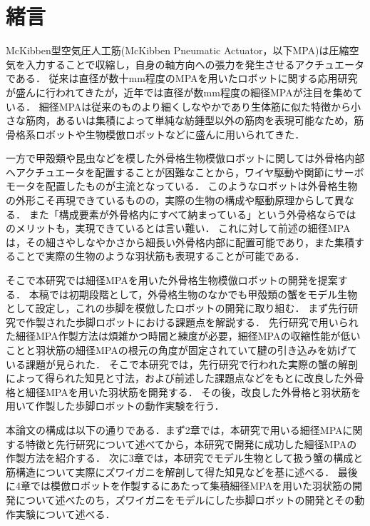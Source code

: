 \newpage
\setcounter{page}{1}
\section{緒言}
McKibben型空気圧人工筋(McKibben Pneumatic Actuator，以下MPA)は圧縮空気を入力することで収縮し，自身の軸方向への張力を発生させるアクチュエータである\cite{2003722}．
従来は直径が数十mm程度のMPAを用いたロボットに関する応用研究が盛んに行われてきたが，近年では直径が数mm程度の細径MPAが注目を集めている\cite{wakimoto}．
細径MPAは従来のものより細くしなやかであり生体筋に似た特徴から小さな筋肉，あるいは集積によって単純な紡錘型以外の筋肉を表現可能なため，筋骨格系ロボットや生物模倣ロボットなどに盛んに用いられてきた\cite{森田隆介2016}\cite{森和也2014}．

一方で甲殻類や昆虫などを模した外骨格生物模倣ロボットに関しては外骨格内部へアクチュエータを配置することが困難なことから，ワイヤ駆動や関節にサーボモータを配置したもの\cite{jmse10121804}が主流となっている．
このようなロボットは外骨格生物の外形こそ再現できているものの，実際の生物の構成や駆動原理からして異なる．
また「構成要素が外骨格内にすべて納まっている」という外骨格ならではのメリットも，実現できているとは言い難い．
これに対して前述の細径MPAは，その細さやしなやかさから細長い外骨格内部に配置可能であり，また集積することで実際の生物のような羽状筋も表現することが可能である\cite{2003}．

そこで本研究では細径MPAを用いた外骨格生物模倣ロボットの開発を提案する．
本稿では初期段階として，外骨格生物のなかでも甲殻類の蟹をモデル生物として設定し，これの歩脚を模倣したロボットの開発に取り組む．
まず先行研究\cite{hasegawa}で作製された歩脚ロボットにおける課題点を解説する．
先行研究で用いられた細径MPA作製方法は煩雑かつ時間と練度が必要，細径MPAの収縮性能が低いことと羽状筋の細径MPAの根元の角度が固定されていて腱の引き込みを妨げている課題が見られた．
そこで本研究では，先行研究で行われた実際の蟹の解剖によって得られた知見と寸法，および前述した課題点などをもとに改良した外骨格と細径MPAを用いた羽状筋を開発する．
その後，改良した外骨格と羽状筋を用いて作製した歩脚ロボットの動作実験を行う．

本論文の構成は以下の通りである．まず2章では，本研究で用いる細径MPAに関する特徴と先行研究について述べてから，本研究で開発に成功した細径MPAの作製方法を紹介する．
次に3章では，本研究でモデル生物として扱う蟹の構成と筋構造について実際にズワイガニを解剖して得た知見などを基に述べる．
最後に4章では模倣ロボットを作製するにあたって集積細径MPAを用いた羽状筋の開発について述べたのち，ズワイガニをモデルにした歩脚ロボットの開発とその動作実験について述べる．


